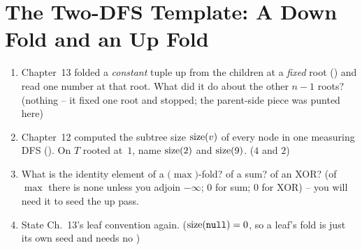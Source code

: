 \section{The Two-DFS Template: A Down Fold and an Up Fold}\label{sec:c20-twodfs}

\begin{previouslybox}
\begin{enumerate}[nosep, leftmargin=1.6em]
  \item Chapter~13 folded a \emph{constant} tuple up from the children at a
        \emph{fixed} root () and read one number
        at that root. What did it do about the other $n-1$ roots? (nothing --
        it fixed one root and stopped; the parent-side piece was punted here)
  \item Chapter~12 computed the subtree size $\operatorname{size}(v)$ of every node in one
        measuring DFS (). On $T$ rooted at~$1$, name
        $\operatorname{size}(2)$ and $\operatorname{size}(9)$. ($4$ and $2$)
  \item What is the identity element of a $\bigl(\max\bigr)$-fold? of a
        sum? of an XOR? (of $\max$ there is none unless you adjoin
        $-\infty$; $0$ for sum; $0$ for XOR) -- you will need it to seed the
        up pass.
  \item State Ch.~13's leaf convention again. ($\operatorname{size}(\texttt{null})=0$, so a leaf's
        fold is just its own seed and needs no )
\end{enumerate}
\end{previouslybox}

